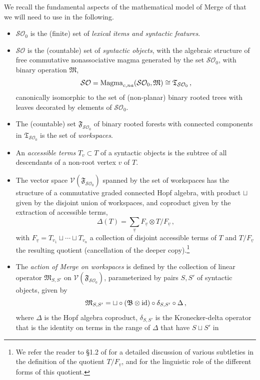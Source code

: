 \documentclass[12pt]{amsart}
\numberwithin{equation}{section}
\def\cO{{\mathcal O}}
\def\cS{{\mathcal S}}
\def\cV{{\mathcal V}}
\def\fM{{\mathfrak M}}
\def\fT{{\mathfrak T}}
\def\fF{{\mathfrak F}}
\def\fB{{\mathfrak B}}
\begin{document}
We recall the fundamental aspects of the mathematical model
of Merge of \cite{MCB} that we will need to use in the following.
\begin{itemize}
\item $\cS\cO_0$ is the (finite) set of {\em lexical items and syntactic features}.
\item $\cS\cO$ is the (countable) set of {\em syntactic objects}, with the algebraic
structure of free commutative nonassociative magma generated by the set $\cS\cO_0$,
with binary operation $\fM$,
$$ \cS\cO = {\rm Magma}_{c,na}(\cS\cO_0, \fM)\cong \fT_{\cS\cO_0}\, , $$
canonically isomorphic to the set of (non-planar) binary rooted trees with
leaves decorated by elements of $\cS\cO_0$.
\item The (countable) set $\fF_{\cS\cO_0}$ of binary rooted forests with
connected components in $\fT_{\cS\cO_0}$ is the set of {\em workspaces}.
\item An {\em accessible terms} $T_v\subset T$ of a syntactic objects is
the subtree of all descendants of a non-root vertex $v$ of $T$.
\item The vector space $\cV(\fF_{\cS\cO_0})$ spanned by the set of workspaces
has the structure of a commutative graded connected Hopf algebra, with product
$\sqcup$ given by the disjoint union of workspaces, and coproduct given by
the extraction of accessible terms,
\begin{equation}\label{coprod}
 \Delta(T)=\sum_{\underline{v}} F_{\underline{v}} \otimes T/F_{\underline{v}} \, , 
\end{equation} 
with $F_{\underline{v}}=T_{v_1}\sqcup\cdots \sqcup T_{v_n}$ a collection of disjoint
accessible terms of $T$ and $T/F_{\underline{v}}$ the resulting quotient (cancellation
of the deeper copy).\footnote{We refer the reader to \S 1.2 of \cite{MCB} for  a
detailed discussion of various subtleties in the definition of the quotient $T/F_{\underline{v}}$,
and for the linguistic role of the different forms of this quotient.}
\item The {\em action of Merge on workspaces} is defined by the collection of linear operator
$\fM_{S,S'}$ on $\cV(\fF_{\cS\cO_0})$, parameterized by pairs $S,S'$ of syntactic objects,
given by
\begin{equation}\label{opMerge}
 \fM_{S,S'} = \sqcup \circ (\fB \otimes {\rm id})\circ \delta_{S,S'} \circ \Delta \, , 
\end{equation} 
where $\Delta$ is the Hopf algebra coproduct, $\delta_{S,S'}$ is the Kronecker-delta
operator that is the identity on terms in the range of $\Delta$ that have $S\sqcup S'$ in

\end{itemize}
\end{document}
